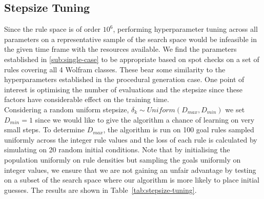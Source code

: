 \subsection{Stepsize Tuning}\label{sub:stepsize-tuning}
 
Since the rule space is of order $10^6$, performing hyperparameter tuning across all parameters on a representative sample of the search space would be infeasible in the given time frame with the resources available. We find the parameters established in \ref{sub:single-case} to be appropriate based on spot checks on a set of rules covering all 4 Wolfram classes. These bear some similarity to the hyperparameters established in the procedural generation case. One point of interest is optimising the number of evaluations and the stepsize since these factors have considerable effect on the training time.\\

Considering a random uniform stepsize, $\delta_k \sim \mathit{Uniform}(D_{max}, D_{min})$ we set $D_{min} = 1$ since we would like to give the algorithm a chance of learning on very small steps. To determine $D_{max}$, the algorithm is run on 100 goal rules sampled uniformly across the integer rule values and the loss of each rule is calculated by simulating on 20 random initial conditions. Note that by initialising the population uniformly on rule densities but sampling the goals uniformly on integer values, we ensure that we are not gaining an unfair advantage by testing on a subset of the search space where our algorithm is more likely to place initial guesses. The results are shown in Table~\ref{tab:stepsize-tuning}.\\

\begin{table} \label{tab:stepsize-tuning}
    \centering\hfill
    \hfill
    \hfill
\end{table}

